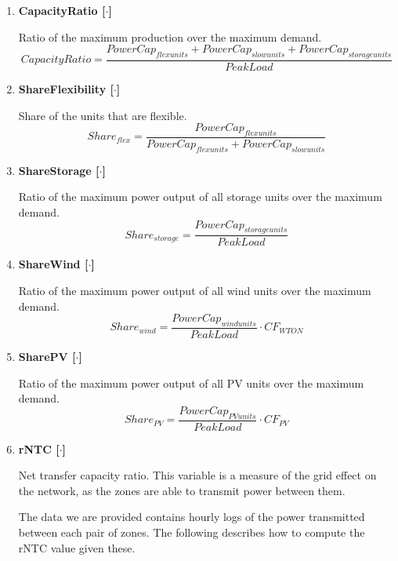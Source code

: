 \begin{enumerate}
    \item \textbf{CapacityRatio [$\cdot$]}
    
    Ratio of the maximum production over the maximum demand.
    \begin{equation}
        CapacityRatio  = \frac{PowerCap_{flex units}+PowerCap_{slow units}+PowerCap_{storage units}}{PeakLoad}
    \end{equation}

    \item \textbf{ShareFlexibility [$\cdot$]}
    
    Share of the units that are flexible.
    \begin{equation}
        {Share_{flex}}=\frac{PowerCap_{flex units}}{PowerCap_{flex units}+PowerCap_{slow units}}	
    \end{equation}

    \item \textbf{ShareStorage [$\cdot$]}
    
    Ratio of the maximum power output of all storage units over the maximum demand.
    \begin{equation}
        {Share_{storage}}=\frac{PowerCap_{storage units}}{PeakLoad}	
    \end{equation}

    \item \textbf{ShareWind [$\cdot$]}
    
    Ratio of the maximum power output of all wind units over the maximum demand.
    \begin{equation}
        Share_{wind}=\frac{PowerCap_{wind units}}{PeakLoad}\cdot CF_{WTON}
    \end{equation}

    \item \textbf{SharePV [$\cdot$]}

    Ratio of the maximum power output of all PV units over the maximum demand.
    \begin{equation}
        {Share_{PV}}=\frac{PowerCap_{PV units}}{PeakLoad}\cdot CF_{PV}
    \end{equation}

    \item \textbf{rNTC [$\cdot$]}
    
    Net transfer capacity ratio. This variable is a measure of the grid effect on the network, as the zones are able to transmit power between them.

    The data we are provided contains hourly logs of the power transmitted between each pair of zones. The following describes how to compute the rNTC value given these.


\end{enumerate}
